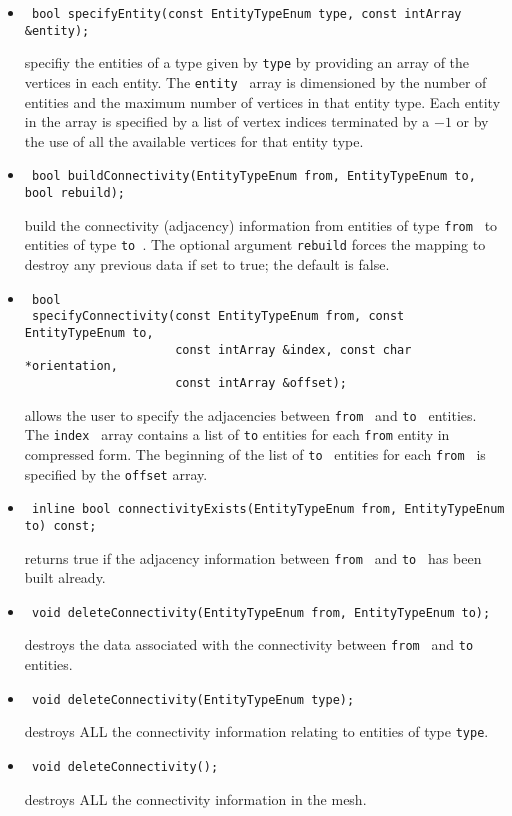 \begin{itemize}
\item \begin{verbatim} bool specifyEntity(const EntityTypeEnum type, const intArray &entity); \end{verbatim}
specifiy the entities of a type given by  {\tt type} by providing an array of the vertices in each entity.
The {\tt entity } array is dimensioned by the number of entities and the maximum number of vertices
in that entity type.  Each entity in the array is specified by a list of vertex indices terminated by a $-1$ or
by the use of all the available vertices for that entity type.

\item \begin{verbatim} bool buildConnectivity(EntityTypeEnum from, EntityTypeEnum to, bool rebuild); \end{verbatim}
build the connectivity (adjacency) information from entities of type {\tt from } to entities of type {\tt to }.
The optional argument {\tt rebuild} forces the mapping to destroy any previous data if set to true; the default is false.

\item \begin{verbatim} 
 bool 
 specifyConnectivity(const EntityTypeEnum from, const EntityTypeEnum to, 
                     const intArray &index, const char *orientation, 
                     const intArray &offset); \end{verbatim}
allows the user to specify the adjacencies between {\tt from } and {\tt to } entities.  The {\tt index } array contains a list
of {\tt to} entities for each {\tt from} entity in compressed form.  The beginning of the list of {\tt to } entities for
each {\tt from } is specified by the {\tt offset} array.

\item \begin{verbatim} inline bool connectivityExists(EntityTypeEnum from, EntityTypeEnum to) const; \end{verbatim}
returns true if the adjacency information between {\tt from } and {\tt to } has been built already.

\item \begin{verbatim} void deleteConnectivity(EntityTypeEnum from, EntityTypeEnum to); \end{verbatim}
destroys the data associated with the connectivity between {\tt from } and {\tt to } entities.

\item \begin{verbatim} void deleteConnectivity(EntityTypeEnum type); \end{verbatim}
destroys ALL the connectivity information relating to entities of type {\tt type}.

\item \begin{verbatim} void deleteConnectivity(); \end{verbatim}
destroys ALL the connectivity information in the mesh.
\end{itemize}

